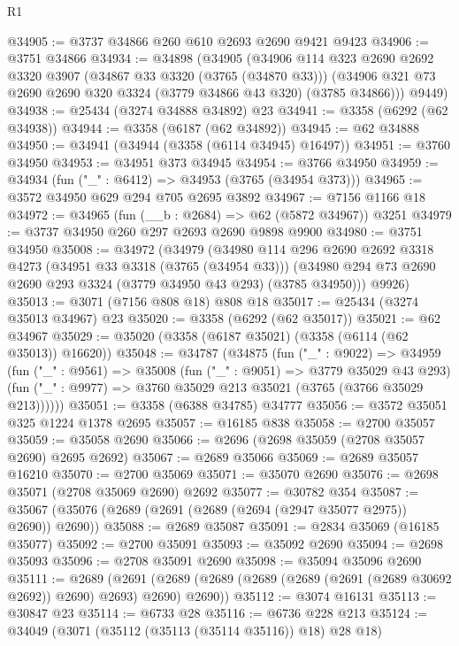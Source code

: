 \begin{lexlean}{R1}
\begin{coremodule}
@34905 := @3737 @34866 @260 @610 @2693 @2690 @9421 @9423
@34906 := @3751 @34866
@34934 := @34898
    (@34905
      (@34906
        @114
        @323
        @2690
        @2692
        @3320
        @3907
        (@34867 @33 @3320 (@3765 (@34870 @33)))
        (@34906 @321 @73 @2690 @2690 @320 @3324 (@3779 @34866 @43 @320) (@3785 @34866)))
      @9449)
@34938 := @25434 (@3274 @34888 @34892) @23
@34941 := @3358 (@6292 (@62 @34938))
@34944 := @3358 (@6187 (@62 @34892))
@34945 := @62 @34888
@34950 := @34941 (@34944 (@3358 (@6114 @34945) @16497))
@34951 := @3760 @34950
@34953 := @34951 @373 @34945
@34954 := @3766 @34950
@34959 := @34934 (fun ("_" : @6412) => @34953 (@3765 (@34954 @373)))
@34965 := @3572 @34950 @629 @294 @705 @2695 @3892
@34967 := @7156 @1166 @18
@34972 := @34965 (fun (__b : @2684) => @62 (@5872 @34967)) @3251
@34979 := @3737 @34950 @260 @297 @2693 @2690 @9898 @9900
@34980 := @3751 @34950
@35008 := @34972
    (@34979
      (@34980
        @114
        @296
        @2690
        @2692
        @3318
        @4273
        (@34951 @33 @3318 (@3765 (@34954 @33)))
        (@34980 @294 @73 @2690 @2690 @293 @3324 (@3779 @34950 @43 @293) (@3785 @34950)))
      @9926)
@35013 := @3071 (@7156 @808 @18) @808 @18
@35017 := @25434 (@3274 @35013 @34967) @23
@35020 := @3358 (@6292 (@62 @35017))
@35021 := @62 @34967
@35029 := @35020 (@3358 (@6187 @35021) (@3358 (@6114 (@62 @35013)) @16620))
@35048 := @34787
    (@34875
      (fun ("_" : @9022) =>
      @34959
        (fun ("_" : @9561) =>
        @35008
          (fun ("_" : @9051) => @3779 @35029 @43 @293)
          (fun ("_" : @9977) => @3760 @35029 @213 @35021 (@3765 (@3766 @35029 @213))))))
@35051 := @3358 (@6388 @34785) @34777
@35056 := @3572 @35051 @325 @1224 @1378 @2695
@35057 := @16185 @838
@35058 := @2700 @35057
@35059 := @35058 @2690
@35066 := @2696 (@2698 @35059 (@2708 @35057 @2690) @2695 @2692)
@35067 := @2689 @35066
@35069 := @2689 @35057 @16210
@35070 := @2700 @35069
@35071 := @35070 @2690
@35076 := @2698 @35071 (@2708 @35069 @2690) @2692
@35077 := @30782 @354
@35087 := @35067 (@35076 (@2689 (@2691 (@2689 (@2694 (@2947 @35077 @2975)) @2690)) @2690))
@35088 := @2689 @35087
@35091 := @2834 @35069 (@16185 @35077)
@35092 := @2700 @35091
@35093 := @35092 @2690
@35094 := @2698 @35093
@35096 := @2708 @35091 @2690
@35098 := @35094 @35096 @2690
@35111 := @2689
    (@2691 (@2689 (@2689 (@2689 (@2689 (@2691 (@2689 @30692 @2692)) @2690) @2693) @2690) @2690))
@35112 := @3074 @16131
@35113 := @30847 @23
@35114 := @6733 @28
@35116 := @6736 @228 @213
@35124 := @34049 (@3071 (@35112 (@35113 (@35114 @35116)) @18) @28 @18)

\end{coremodule}
\end{lexlean}
